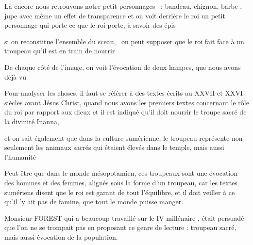 \documentclass[a4paper]{article}
\begin{document}
\bigskip


\bigskip


\bigskip

{
Là encore nous retrouvons notre petit personnages \ : bandeau, chignon,
barbe , jupe avec même un effet de transparence et on voit derrière le
roi un petit personnage qui porte ce que le roi porte, à savoir des
épis}

{
si on reconstitue l'ensemble du sceau, \ on peut supposer que le roi
fait face à un troupeau qu'il est en train de nourrir}


\bigskip

{
De chaque côté de l'image, on voit l'évocation de deux hampes, que nous
avons déjà vu}


\bigskip

{
Pour analyser les choses, il faut se référer à des textes écrits au
XXVII et XXVI siècles avant Jésus Christ, quand nous avons les premiers
textes concernant le rôle du roi par rapport aux dieux et il est
indiqué qu'il doit nourrir le troupe sacré de la divinité Inanna, }

{
et on sait également que dans la culture sumérienne, le troupeau
représente non seulement les animaux sacrés qui étaient élevés dans le
temple, mais aussi l'humanité}


\bigskip

{
Peut être que dans le monde mésopotamien, ces troupeaux sont une
évocation des hommes et des femmes, alignés sous la forme d'un
troupeau, car les textes sumériens disent que le roi est garant de tout
l'équilibre, et il doit veiller à ce qu'il 'y ait pas de famine, que
tout le monde puisse manger.}


\bigskip

{
Monsieur FOREST qui a beaucoup travaillé sur le IV millénaire , était
persuadé que l'on ne se trompait pas en proposant ce genre de lecture :
troupeau sacré, mais aussi évocation de la population.}


\bigskip


\bigskip


\bigskip


\bigskip


\bigskip


\bigskip


\bigskip


\bigskip


\bigskip
\end{document}
